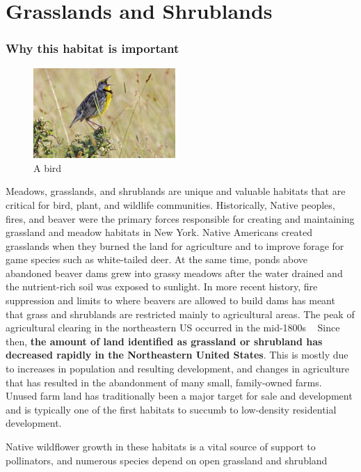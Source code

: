 \chapter{Grasslands and Shrublands}\label{subsec:grasslandsandshrublands}
\subsection*{Why this habitat is important}
\begin{figure}
    \includegraphics[width=0.48\textwidth]{images/bird.jpg}
  \caption{A bird}
\end{figure}
Meadows, grasslands, and shrublands are unique and valuable habitats that are 
critical for bird, plant, and wildlife communities. Historically, Native 
peoples, fires, and beaver were the primary forces responsible for creating and 
maintaining grassland and meadow habitats in New York. Native Americans created 
grasslands when they burned the land for agriculture and to improve forage for 
game species such as white-tailed deer. At the same time, ponds above abandoned 
beaver dams grew into grassy meadows after the water drained and the 
nutrient-rich soil was exposed to sunlight. In more recent history, fire 
suppression and limits to where beavers are allowed to build dams has meant that 
grass and shrublands are restricted mainly to agricultural areas. The peak of 
agricultural clearing in the northeastern US occurred in the mid-1800s 
~\citep{unhextension} Since then, \textbf{the amount of land identified as grassland or 
shrubland has decreased rapidly in the Northeastern United States}. This is 
mostly due to increases in population and resulting development, and changes in 
agriculture that has resulted in the abandonment of many small, family-owned 
farms. Unused farm land has traditionally been a major target for sale and 
development and is typically one of the first habitats to succumb to low-density 
residential development.
\par
Native wildflower growth in these habitats is a vital source of support to
pollinators, and numerous species depend on open grassland and shrubland
